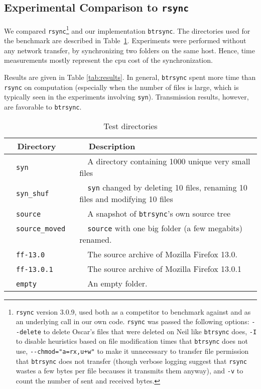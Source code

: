 \documentclass[twoside,envcountsame,runningheads]{llncs}
\newcommand{\btrsync}{\texttt{btrsync}\xspace}
\newcommand{\rsync}{\texttt{rsync}\xspace}
\begin{document}
\subsection{Experimental Comparison to \rsync}

We compared \rsync\footnote{\rsync version 3.0.9, used both as a competitor to
benchmark against and as an underlying call in our own code. \rsync was passed
the following options: {\tt {-}{-}delete} to delete Oscar's files that were
deleted on Neil like \btrsync does, {\tt -I} to disable heuristics based on file
modification times that \btrsync does not use, {\tt {-}{-}chmod="a=rx,u+w"} to make it unnecessary to
transfer file permission that \btrsync does not transfer (though verbose logging
suggest that \rsync wastes a few bytes per file becauses it transmits them
anyway), and {\tt -v} to count the number of sent and received bytes.} and our
implementation \btrsync. The directories used for the
benchmark are described in Table~\ref{tab:benchdirec}.
Experiments
were performed without any network transfer, by synchronizing two folders on
the same host. Hence, time measurements mostly represent the {\sc cpu} cost of
the synchronization.

Results are given in Table \ref{tab:results}. In general, \btrsync spent more time than \rsync on computation (especially when the number of files is large, which is typically seen in the experiments involving {\tt syn}). Transmission results, however, are favorable to \btrsync.

\begin{table}[t]
\centering
  \caption{Test directories}
  \label{tab:benchdirec}
\begin{tabular}{ll}\toprule
~~{\bf Directory}              ~~&~~{\bf Description}\\\midrule
~~{\tt syn}              ~~&~~A directory containing 1000 unique very small files\\
~~{\tt syn\_shuf}    ~~&~~{\tt syn} changed by deleting 10 files, renaming 10 files and modifying 10 files \\
~~{\tt source}                 ~~& ~~A snapshot of \btrsync's own source tree \\
~~{\tt source\_moved}          ~~& ~~{\tt source} with one big folder (a few megabits) renamed.~~\\
~~{\tt ff-13.0}           ~~& ~~The source archive of Mozilla Firefox 13.0.\\
~~{\tt ff-13.0.1}         ~~& ~~The source archive of Mozilla Firefox 13.0.1\\
~~{\tt empty}                  ~~& ~~An empty folder.\\\bottomrule
\end{tabular}\smallskip
\end{table}
\end{document}
